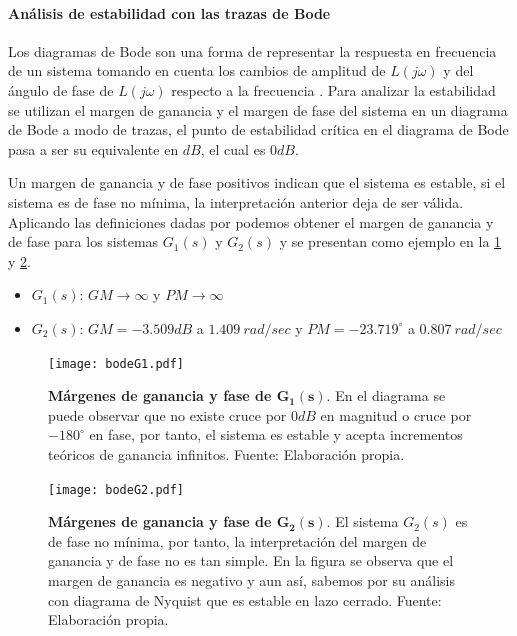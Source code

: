             \paragraph{Análisis de estabilidad con las trazas de Bode}

                Los diagramas de Bode son una forma de representar la respuesta en frecuencia de un sistema tomando en cuenta los cambios de amplitud de $L(j\omega)$ y del ángulo de fase de $L(j\omega)$ respecto a la frecuencia \Parencite{nilsson1995circuitos}. Para analizar la estabilidad se utilizan el margen de ganancia y el margen de fase del sistema en un diagrama de Bode a modo de trazas, el punto de estabilidad crítica en el diagrama de Bode pasa a ser su equivalente en $dB$, el cual es $0dB$.

                Un margen de ganancia y de fase positivos indican que el sistema es estable, si el sistema es de fase no mínima, la interpretación anterior deja de ser válida. Aplicando las definiciones dadas por \textcite{dorf2011modern} podemos obtener el margen de ganancia y de fase para los sistemas $G_1(s)$ y $G_2(s)$ y se presentan como ejemplo en la \cref{fig:bodeG1} y \cref{fig:bodeG2}.

                \begin{itemize}[leftmargin=\parindent]
                    \item $G_1(s)$: $GM \rightarrow \infty$ y $PM \rightarrow \infty$
                    \item $G_2(s)$: $GM = -3.509dB$ a $1.409\ rad/sec$ y $PM = -23.719^\circ$ a $0.807\ rad/sec$
                \end{itemize}

                \begin{figure}[htb]
                    \centering
                    \texttt{[image: bodeG1.pdf]}
                    \caption[Ejemplo 1 márgenes de ganancia y fase]{\textbf{Márgenes de ganancia y fase de $\pmb{G_1(s)}$}. En el diagrama se puede observar que no existe cruce por $0dB$ en magnitud o cruce por $-180^\circ$ en fase, por tanto, el sistema es estable y acepta incrementos teóricos de ganancia infinitos. Fuente: Elaboración propia.}
                    \label{fig:bodeG1}
                \end{figure}

                \begin{figure}[htb]
                    \centering
                    \texttt{[image: bodeG2.pdf]}
                    \caption[Ejemplo 2 márgenes de ganancia y fase]{\textbf{Márgenes de ganancia y fase de $\pmb{G_2(s)}$}. El sistema $G_2(s)$ es de fase no mínima, por tanto, la interpretación del margen de ganancia y de fase no es tan simple. En la figura se observa que el margen de ganancia es negativo y aun así, sabemos por su análisis con diagrama de Nyquist que es estable en lazo cerrado. Fuente: Elaboración propia.} 
                    \label{fig:bodeG2}
                \end{figure}

